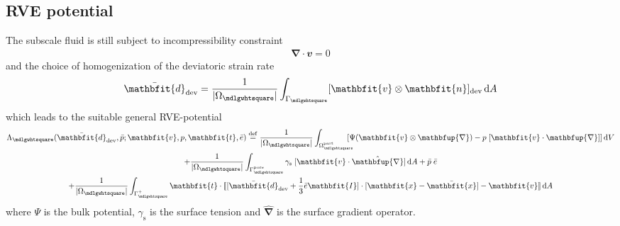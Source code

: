 \documentclass[notitlepage,a4paper,fleqn,9pt]{extarticle}
\renewcommand{\ta}[1]{\mathbfit{#1}}
\renewcommand{\ts}[1]{\mathbfit{#1}}
\renewcommand{\diff}{\mathbfup{\nabla}}
\renewcommand{\Box}{\mdlgwhtsquare}
\newcommand{\volume}{\frac{1}{|\Omega_\Box|}}
\newcommand{\jump}[1]{[\![#1]\!]}
\newcommand{\pore}{\mathrm{pore}}
\newcommand{\particle}{\mathrm{part}}
\newcommand{\surf}{\mathrm{s}}
\begin{document}
\begin{multicols}{2}
\subsection{RVE potential}
The subscale fluid is still subject to incompressibility constraint
\begin{gather}
 \diff \cdot \ta v = 0
\end{gather}
and the choice of homogenization of the deviatoric strain rate
\begin{align}
 \bar{\ts d}_\dev = \volume\int_{\Gamma_\Box} [\ta v \outerp \ta n]_\dev \dif A
\end{align}
which leads to the suitable general RVE-potential
\begin{multline}
 \Lambda_\Box(\bar{\ts d}_\dev, \bar{p}; \ta v, p, \ta t, \bar{e}) \defeq
     \volume\int_{\Omega_\Box^\particle} \!\!\!\!\![\Psi(\ta v\outerp\diff) - p\;[\ta v\cdot\diff]] \dif V
\\
   + \volume\int_{\Gamma_\Box^\pore} \gamma_\surf \;[\ta v \cdot \hat{\diff}]\dif A
  + \bar{p}\; \bar{e}
\\
  + \volume \int_{\Gamma_\Box^+} \ta t \cdot \jump{[\bar{\ts d}_\dev + \frac13\bar{e}\ts I]\cdot[\ta x - \bar{\ta x}] - \ta v}\dif A
\end{multline}
where $\Psi$ is the bulk potential, $\gamma_\surf$ is the surface tension and $\hat{\diff}$ is the surface gradient operator.


\end{multicols}
\end{document}
